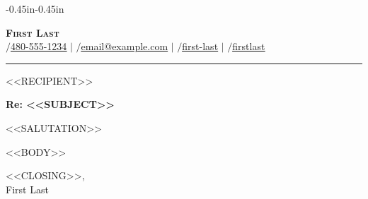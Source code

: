 \documentclass[letterpaper,11pt]{article}
\begin{document}
\begin{adjustwidth}{-0.45in}{-0.45in}  %
\begin{center}
    \textbf{\Huge \scshape First Last} \\ \vspace{1pt}
    \faPhone$/$\href{tel://+14805551234}{\underline{480-555-1234}} $|$
    \faEnvelope$/$\href{mailto:email@example.com}{\underline{email@example.com}} $|$
    \faLinkedin$/$\href{https://linkedin.com/in/first-last}{\underline{first-last}} $|$
    \faGithub$/$\href{https://github.com/firstlast}{\underline{firstlast}}
\end{center}
\end{adjustwidth}
\vspace{-4pt}
\rule{\textwidth}{0.4pt}

<<RECIPIENT>>

\textbf{Re: <<SUBJECT>>}

<<SALUTATION>>

<<BODY>>

<<CLOSING>>,\\
First Last
\end{document}
